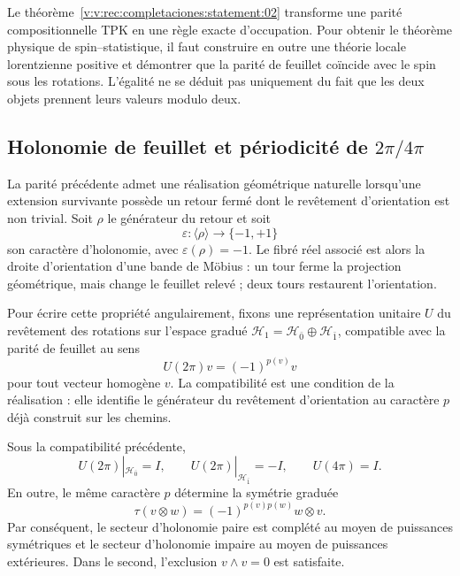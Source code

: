Le théorème~\ref{v:v:rec:completaciones:statement:02} transforme une parité compositionnelle TPK en une règle exacte
d’occupation. Pour obtenir le théorème physique de spin--statistique, il faut
construire en outre une théorie locale lorentzienne positive et démontrer que la
parité de feuillet coïncide avec le spin sous les rotations. L’égalité ne se
déduit pas uniquement du fait que les deux objets prennent leurs valeurs modulo deux.

\subsection{Holonomie de feuillet et périodicité de \texorpdfstring{\(2\pi/4\pi\)}{2pi/4pi}}
\label{v:v:rec:completaciones:section:05}

La parité précédente admet une réalisation géométrique naturelle lorsqu’une
extension survivante possède un retour fermé dont le revêtement d’orientation
est non trivial. Soit \(\rho\) le générateur du retour et soit
\[
 \varepsilon:\langle\rho\rangle\longrightarrow\{-1,+1\}
\]
son caractère d’holonomie, avec \(\varepsilon(\rho)=-1\). Le fibré réel
associé est alors la droite d’orientation d’une bande de Möbius : un
tour ferme la projection géométrique, mais change le feuillet relevé ; deux
tours restaurent l’orientation.

Pour écrire cette propriété angulairement, fixons une représentation
unitaire \(U\) du revêtement des rotations sur l’espace gradué
\(\mathcal H_1=\mathcal H_{\bar0}\oplus\mathcal H_{\bar1}\), compatible avec
la parité de feuillet au sens
\[
 U(2\pi)v=(-1)^{p(v)}v
\]
pour tout vecteur homogène \(v\). La compatibilité est une condition de la
réalisation : elle identifie le générateur du revêtement d’orientation au
caractère \(p\) déjà construit sur les chemins.

\begin{theorem}
\label{v:v:rec:thm:dos-cuatro-pi-estadistica}
Sous la compatibilité précédente,
\[
 U(2\pi)|_{\mathcal H_{\bar0}}=I,
 \qquad
 U(2\pi)|_{\mathcal H_{\bar1}}=-I,
 \qquad
 U(4\pi)=I.
\]
En outre, le même caractère \(p\) détermine la symétrie graduée
\[
 \tau(v\otimes w)=(-1)^{p(v)p(w)}w\otimes v.
\]
Par conséquent, le secteur d’holonomie paire est complété au moyen de puissances
symétriques et le secteur d’holonomie impaire au moyen de puissances extérieures. Dans
le second, l’exclusion \(v\wedge v=0\) est satisfaite.
\end{theorem}

